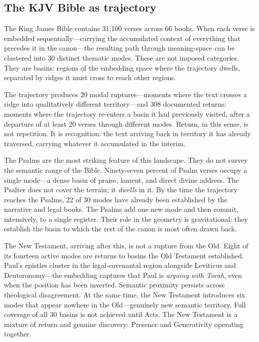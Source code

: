 \subsection{The KJV Bible as trajectory}

The King James Bible contains 31,100 verses across 66 books. When each verse is embedded sequentially---carrying the accumulated context of everything that precedes it in the canon---the resulting path through meaning-space can be clustered into 30 distinct thematic modes. These are not imposed categories. They are basins: regions of the embedding space where the trajectory dwells, separated by ridges it must cross to reach other regions.

The trajectory produces 20 modal ruptures---moments where the text crosses a ridge into qualitatively different territory---and 308 documented returns: moments where the trajectory re-enters a basin it had previously visited, after a departure of at least 20 verses through different modes. Return, in this sense, is not repetition. It is recognition: the text arriving back in territory it has already traversed, carrying whatever it accumulated in the interim.

The Psalms are the most striking feature of this landscape. They do not survey the semantic range of the Bible. Ninety-seven percent of Psalm verses occupy a single mode---a dense basin of praise, lament, and direct divine address. The Psalter does not cover the terrain; it \textit{dwells} in it. By the time the trajectory reaches the Psalms, 22 of 30 modes have already been established by the narrative and legal books. The Psalms add one new mode and then commit, intensively, to a single register. Their role in the geometry is gravitational: they establish the basin to which the rest of the canon is most often drawn back.

The New Testament, arriving after this, is not a rupture from the Old. Eight of its fourteen active modes are returns to basins the Old Testament established. Paul's epistles cluster in the legal-covenantal region alongside Leviticus and Deuteronomy---the embedding captures that Paul is \emph{arguing with Torah}, even when the position has been inverted. Semantic proximity persists across theological disagreement. At the same time, the New Testament introduces six modes that appear nowhere in the Old---genuinely new semantic territory. Full coverage of all 30 basins is not achieved until Acts. The New Testament is a mixture of return and genuine discovery: Presence and Generativity operating together.

